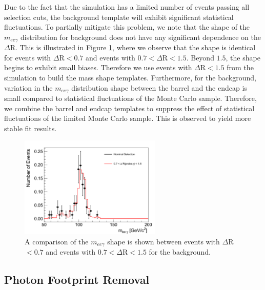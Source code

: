 \documentclass{cmspaper}
\begin{document}
Due to the fact that the simulation has a limited number of events passing all selection cuts, the 
background template will exhibit significant statistical fluctuations. To partially mitigate this problem,
we note that the shape of the $m_{ee\gamma}$ distribution for background does not have any significant 
dependence on the $\Delta$R. This is illustrated in Figure \ref{fig:BackgroundShapeModeling}, where we 
observe that the shape is identical for events with $\Delta$R$<0.7$ and events 
with $0.7 < \Delta$R$<1.5$. Beyond $1.5$, the shape begins to exhibit small biases. 
Therefore we use events with $\Delta$R$<1.5$ from the simulation to build the mass shape templates. 
Furthermore, for the background, variation in the $m_{ee\gamma}$ distribution shape
between the barrel and the endcap is small compared to statistical fluctuations of the 
Monte Carlo sample. Therefore, we combine the barrel and endcap templates to suppress
the effect of statistical fluctuations of the limited Monte Carlo sample. This is observed to yield
more stable fit results.


\begin{figure}[htb]
  \begin{center}
    \includegraphics[width=0.6\textwidth]{figures/MassEEGamma_BackgroundShapeModeling.pdf}
    \caption{A comparison of the $m_{ee\gamma}$ shape is shown between events with $\Delta$R$<0.7$ and events 
      with $0.7 < \Delta$R$<1.5$ for the background.
    }
    \label{fig:BackgroundShapeModeling}
  \end{center}
\end{figure}

\subsection{ Photon Footprint Removal }
\end{document}

